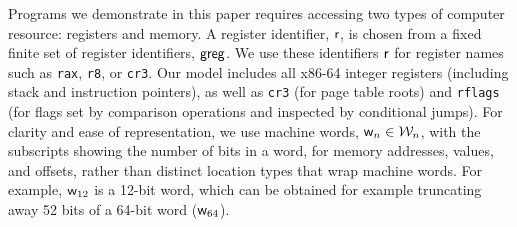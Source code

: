 Programs we demonstrate in this paper requires accessing two types of computer resource: registers and memory.
A register identifier, $\mathsf{r}$, is chosen from a fixed finite set of register identifiers, $\mathsf{greg}$. 
We use these identifiers $\mathsf{r}$ for register names such as \texttt{rax}, \texttt{r8}, or \texttt{cr3}. Our model includes
all x86-64 integer registers (including stack and instruction pointers), as well as \texttt{cr3} (for page table roots) and \texttt{rflags} (for
flags set by comparison operations and inspected by conditional jumps).
For clarity and ease of representation, we use machine words, $\mathsf{w}_n \in \mathcal{W}_n$, with the subscripts showing the number of bits in a word,
for memory addresses, values, and offsets, rather than distinct location types that wrap machine words.
For example, $\mathsf{w}_{12}$ is a 12-bit word, which can be obtained for example truncating away 52 bits of a 64-bit word ($\mathsf{w}_{64}$).

